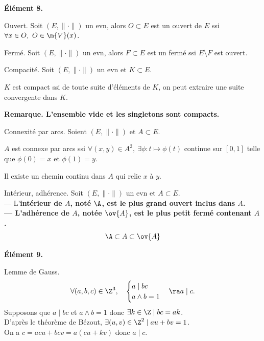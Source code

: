 \documentclass[11pt]{article}
\begin{document}
\bf{Élément 8.}

\begin{defi}{Ouvert.}{}
    Soit $(E,\|\cdot\|)$ un evn, alors $O\subset E$ est un ouvert de $E$ ssi $\forall x \in O, ~ O\in\m{V}(x)$.
\end{defi}

\begin{defi}{Fermé.}{}
    Soit $(E,\|\cdot\|)$ un evn, alors $F\subset E$ est un fermé ssi $E\setminus F$ est ouvert.
\end{defi}

\begin{defi}{Compacité.}{}
    Soit $(E,\|\cdot\|)$ un evn et $K\subset E$.
    \begin{center}
        $K$ est compact ssi de toute suite d'éléments de $K$, on peut extraire une suite convergente dans $K$.
    \end{center}
    \bf{Remarque.} L'ensemble vide et les singletons sont compacts.
\end{defi}

\begin{defi}{Connexité par arcs.}{}
    Soient $(E,\|\cdot\|)$ et $A\subset E$.
    \begin{center}
        $A$ est connexe par arcs ssi $\forall(x,y)\in A^2, ~ \exists \phi : t \mapsto \phi(t)$ continue sur $[0,1]$ telle que $\phi(0)=x$ et $\phi(1)=y$.
    \end{center}
    Il existe un chemin continu dans $A$ qui relie $x$ à $y$.
\end{defi}

\begin{defi}{Intérieur, adhérence.}{}
    Soit $(E,\|\cdot\|)$ un evn et $A\subset E$.\\
    --- L'\bf{intérieur} de $A$, noté $\A$, est le plus grand ouvert inclus dans $A$.\\
    --- L'\bf{adhérence} de $A$, notée $\ov{A}$, est le plus petit fermé contenant $A$.
    \begin{equation*}
        \A\subset A \subset \ov{A}
    \end{equation*}
\end{defi}

\bf{Élément 9.}

\begin{thm}{Lemme de Gauss.}{}
    \begin{equation*}
        \forall(a,b,c)\in\Z^3,\quad\begin{cases}
            a\mid bc\\
            a\land b = 1
        \end{cases}\ra a \mid c.
    \end{equation*}
    \tcblower
    Supposons que $a\mid bc$ et $a\land b=1$ donc $\exists k \in \Z \mid bc = ak$.\\
    D'après le théorème de Bézout, $\exists (u,v)\in\Z^2\mid au+bv=1$.\\
    On a $c=acu+bcv=a(cu+kv)$ donc $a\mid c$.
\end{thm}
\end{document}
